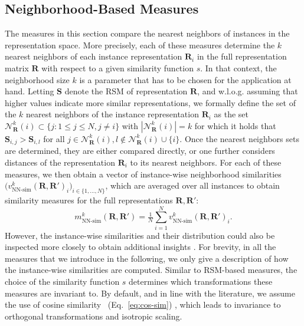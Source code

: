 \documentclass{article}
\newcommand{\R}{\bm{R}}
\newcommand{\Rp}{\bm{R'}}
\newcommand{\Sm}{\bm{S}}
\newcommand\myeqref[1]{%
    (\textup{Eq.~\ref{#1}})%
}
\begin{document}
\subsection{Neighborhood-Based Measures}
The measures in this section compare the nearest neighbors of instances in the representation space.
More precisely, each of these measures determine the $k$ nearest neighbors of each instance representation $\R_i$ in the full representation matrix $\R$ with respect to a given similarity function $s$. In that context, the neighborhood size $k$ is a parameter that has to be chosen for the application at hand.
Letting $\Sm$ denote the RSM of representation $\R$, and w.l.o.g. assuming that higher values indicate more similar representations, we formally define the set of the $k$ nearest neighbors of the instance representation $\R_i$ as the set $\mathcal{N}^k_{\R}(i)  \subset \{j: 1\leq j \leq N, j\not=i\}$ with $|\mathcal{N}^k_{\R}(i)| = k$ for which it holds that $\Sm_{i,j} > \Sm_{i,l}$ for all $j\in \mathcal{N}^k_{\R}(i), l\not\in \mathcal{N}^k_{\R}(i)\cup\{i\}$.
Once the nearest neighbors sets are determined, they are either compared directly, or one further considers distances of the representation $\R_i$ to its nearest neighbors.
For each of these measures, we then obtain a vector of instance-wise neighborhood similarities $\big(v_{\operatorname{NN-sim}}^k(\R,\Rp)_i\big)_{i\in\{1,\dots,N\}}$, which are averaged over all instances to obtain similarity measures for the full representations $\R,\Rp$:
\begin{equation}
    m_{\operatorname{NN-sim}}^k(\R,\Rp) = \tfrac{1}{N} \textstyle\sum_{i=1}^N v_{\operatorname{NN-sim}}^k(\R,\Rp)_i.
\end{equation}
However, the instance-wise similarities and their distribution could also be inspected more closely to obtain additional insights \cite{kolling_pointwise_2023}.
For brevity, in all the measures that we introduce in the following, we only give a description of how the instance-wise similarities are computed.
Similar to RSM-based measures, the choice of the similarity function $s$ determines which transformations these measures are invariant to.
By default, and in line with the literature, we assume the use of cosine similarity~\myeqref{eq:cos-sim}, which leads to invariance to orthogonal transformations and isotropic scaling.
\end{document}
